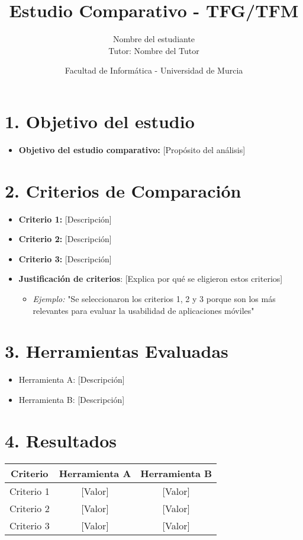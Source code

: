 \documentclass[12pt, a4paper]{article}
\title{\textbf{Estudio Comparativo - TFG/TFM}}
\author{Nombre del estudiante \\ Tutor: Nombre del Tutor}
\date{Facultad de Informática - Universidad de Murcia}
\begin{document}
\maketitle
\section*{1. Objetivo del estudio}
\begin{itemize}
    \item \textbf{Objetivo del estudio comparativo:} [Propósito del análisis]
\end{itemize}
\section*{2. Criterios de Comparación}
\begin{itemize}
    \item \textbf{Criterio 1:} [Descripción]
    \item \textbf{Criterio 2:} [Descripción]
    \item \textbf{Criterio 3:} [Descripción]
\end{itemize}

\begin{itemize}
    \item \textbf{Justificación de criterios}: [Explica por qué se eligieron estos criterios]
    \begin{itemize}
        \item \textit{Ejemplo:} "Se seleccionaron los criterios 1, 2 y 3 porque son los más relevantes para evaluar la usabilidad de aplicaciones móviles"
    \end{itemize}
\end{itemize}

\section*{3. Herramientas Evaluadas}
\begin{itemize}
    \item Herramienta A: [Descripción]
    \item Herramienta B: [Descripción]
\end{itemize}

\section*{4. Resultados}
\begin{tabular}{|c|c|c|}
    \hline
    \textbf{Criterio} & \textbf{Herramienta A} & \textbf{Herramienta B} \\ \hline
    Criterio 1 & [Valor] & [Valor] \\ \hline
    Criterio 2 & [Valor] & [Valor] \\ \hline
    Criterio 3 & [Valor] & [Valor] \\ \hline
\end{tabular}
\end{document}
